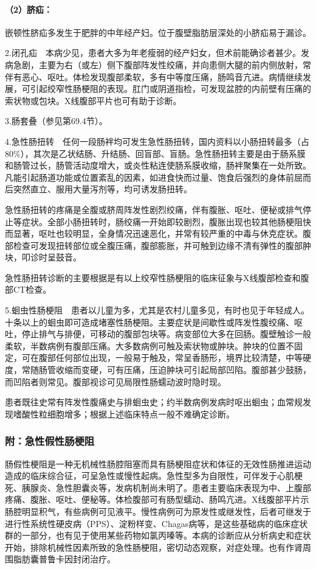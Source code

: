 \paragraph{（2）脐疝：}

嵌顿性脐疝多发生于肥胖的中年经产妇。位于腹壁脂肪层深处的小脐疝易于漏诊。

2.闭孔疝　本病少见，患者大多为年老瘦弱的经产妇女，但术前能确诊者甚少。发病急剧，主要为右（或左）侧下腹部阵发性绞痛，并向患侧大腿的前内侧放射，常伴有恶心、呕吐。体检发现腹部柔软，多有中等度压痛，肠鸣音亢进。病情继续发展，可引起绞窄性肠梗阻的表现。肛门或阴道指检，可发现盆腔的内前壁有压痛的索状物或包块。X线腹部平片也可有助于诊断。

3.肠套叠（参见第69.4节）。

4.急性肠扭转　任何一段肠袢均可发生急性肠扭转，国内资料以小肠扭转最多（占80\%），其次是乙状结肠、升结肠、回盲部、盲肠。急性肠扭转主要是由于肠系膜和肠管过长，肠管活动度增大，或炎性粘连使肠系膜收缩，肠袢聚集在一处所致。凡能引起肠道功能或位置紊乱的因素，如进食快而过量、饱食后强烈的身体前屈而后突然直立、服用大量泻剂等，均可诱发肠扭转。

急性肠扭转的疼痛是全腹或脐周阵发性剧烈绞痛，伴有腹胀、呕吐、便秘或排气停止等症状。全部小肠扭转时，肠绞痛一开始即较剧烈，腹胀出现也较其他肠梗阻快而显著，呕吐也较明显，全身情况迅速恶化，并常有较严重的中毒与休克症状。腹部检查可发现扭转部位或全腹压痛，腹部膨胀，并可触到边缘不清有弹性的腹部肿块，叩诊时呈鼓音。

急性肠扭转诊断的主要根据是有以上绞窄性肠梗阻的临床征象与X线腹部检查和腹部CT检查。

5.蛔虫性肠梗阻　患者以儿童为多，尤其是农村儿童多见，有时也见于年轻成人。十条以上的蛔虫即可造成堵塞性肠梗阻。主要症状是间歇性或阵发性腹绞痛、呕吐，停止排气与排便，可移动的腹部包块等。病变部位大多在回肠。腹壁触诊一般柔软，半数病例有腹部压痛。大多数病例可触及索状物或肿块。肿块的位置不固定，可在腹部任何部位出现，一般易于触及，常呈香肠形，境界比较清楚，中等硬度，常随肠管收缩而变硬，可有压痛，压迫肿块可引起局部凹陷。腹部甚少鼓肠，而凹陷者则常见。腹部视诊可见局限性肠蠕动波时隐时现。

患者既往史常有阵发性腹痛史与排蛔虫史；约半数病例发病时呕出蛔虫；血常规发现嗜酸性粒细胞增多；根据上述临床特点一般不难确定诊断。

\subsubsection{附：急性假性肠梗阻}

肠假性梗阻是一种无机械性肠腔阻塞而具有肠梗阻症状和体征的无效性肠推进运动造成的临床综合征，可呈急性或慢性起病。急性型多为自限性，可伴发于心肌梗死、胰腺炎、急性胆囊炎等，发病机制尚未明了。患者主要临床表现为中、上腹部疼痛、腹胀、呕吐、便秘等。体检腹部可有肠型蠕动、肠鸣亢进。X线腹部平片示肠腔明显积气，有些病例可见液平。慢性病例可为原发性或继发性，后者可继发于进行性系统性硬皮病（PPS）、淀粉样变、Chagas病等，是这些基础病的临床症状群的一部分，也有见于使用某些药物如氯丙嗪等。本病的诊断应从分析病史和症状开始，排除机械性因素所致的急性肠梗阻，密切动态观察，对症处理。也有作肾周围脂肪囊普鲁卡因封闭治疗。

